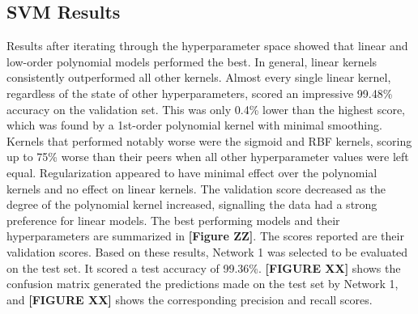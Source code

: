 \documentclass{article}
\begin{document}
\subsection*{SVM Results}
Results after iterating through the hyperparameter space showed that linear and low-order polynomial models performed the best. In general, linear kernels consistently outperformed all other kernels. Almost every single linear kernel, regardless of the state of other hyperparameters, scored an impressive 99.48\% accuracy on the validation set. This was only 0.4\% lower than the highest score, which was found by a 1st-order polynomial kernel with minimal smoothing. Kernels that performed notably worse were the sigmoid and RBF kernels, scoring up to 75\% worse than their peers when all other hyperparameter values were left equal. Regularization appeared to have minimal effect over the polynomial kernels and no effect on linear kernels. The validation score decreased as the degree of the polynomial kernel increased, signalling the data had a strong preference for linear models. The best performing models and their hyperparameters are summarized in \textbf{[Figure ZZ]}. The scores reported are their validation scores. Based on these results, Network 1 was selected to be evaluated on the test set. It scored a test accuracy of 99.36\%. \textbf{[FIGURE XX]} shows the confusion matrix generated the predictions made on the test set by Network 1, and \textbf{[FIGURE XX]} shows the corresponding precision and recall scores.
\end{document}
